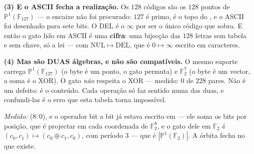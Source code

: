 \documentclass[livro.tex]{subfiles}
\begin{document}
\begin{definicao}
\textbf{(3) E o ASCII fecha a realização.} Os $128$ códigos são os $128$
pontos de $\mathbb{P}^1(\mathbb{F}_{127})$ --- o encaixe não foi
procurado: $127$ é primo, é o topo do , e o ASCII foi
desenhado para sete bits. O DEL é o $\infty$ por ser o único código que
sobra. E então o gato lido em ASCII é uma \textbf{cifra}: uma bijecção
das $128$ letras sem tabela e sem chave, só a lei --- com
$\mathrm{NUL}\mapsto\mathrm{DEL}$, que é $0\mapsto\infty$ escrito em
caracteres.

\textbf{(4) Mas são DUAS álgebras, e não são compatíveis.} O mesmo
suporte carrega $\mathbb{P}^1(\mathbb{F}_{127})$ (o byte é um ponto, o
gato permuta) e $\mathbb{F}_2^{7}$ (o byte é um vector, a soma é o XOR).
O gato \emph{não} respeita o XOR --- medido: $0$ de $228$ pares. Não é um
defeito: é o conteúdo. Cada operação só faz sentido numa das duas, e
confundi-las é o erro que esta tabela torna impossível.

\emph{Medido:}  ($8{:}0$), e o operador bit a bit já
estava escrito em  --- ele soma os bits por
posição, que é projectar em cada coordenada de $\mathbb{F}_2^{8}$, e o
gato dele em $\mathbb{F}_2$ é $(c_0,c_1)\mapsto(c_0\oplus c_1,c_0)$, com
período $3$ --- que é $|\mathbb{P}^1(\mathbb{F}_2)|$. A órbita fecha no
que existe.
\end{definicao}
\end{document}
